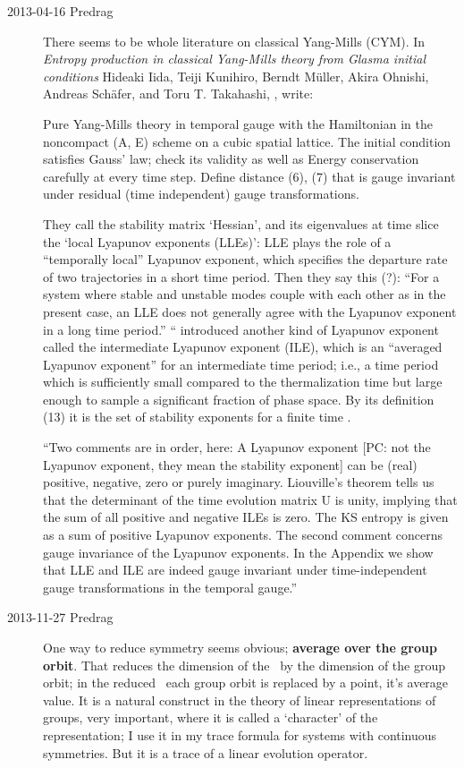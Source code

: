 \begin{description}
\item[2013-04-16  Predrag] There seems to be whole literature on
classical Yang-Mills (CYM). In
{\em Entropy production in classical Yang-Mills theory from Glasma
initial conditions} Hideaki Iida,  Teiji Kunihiro,  Berndt M\"uller,
Akira Ohnishi,  Andreas Sch\"afer,  and Toru T. Takahashi,
, %
write:

Pure Yang-Mills theory in temporal gauge with the Hamiltonian in the
noncompact (A, E) scheme on a cubic spatial lattice. The initial
condition satisfies Gauss' law; check its validity as well as Energy
conservation carefully at every time step. Define distance (6), (7) that
is gauge invariant under residual (time independent) gauge transformations.

                                                    \inCB
They call the stability matrix `Hessian', and its eigenvalues at time
slice the `local Lyapunov exponents (LLEs)': LLE plays the
role of a ``temporally local'' Lyapunov exponent, which specifies the
departure rate of two trajectories in a short time period. Then they say
this (?): ``For a system where stable and unstable modes couple with each
other as in the present case, an LLE does not generally agree with the
Lyapunov exponent in a long time period.'' `` introduced
another kind of Lyapunov exponent called the intermediate Lyapunov
exponent (ILE), which is an ``averaged Lyapunov exponent'' for an
intermediate time period; i.e., a time period which is sufficiently small
compared to the thermalization time but large enough to sample a
significant fraction of phase space. By its definition (13) it
is the set of stability exponents for a finite time \jacobianM.

``Two comments are in order, here: A Lyapunov exponent [PC: not the
Lyapunov exponent, they mean the stability exponent] can be (real)
positive, negative, zero or purely imaginary. Liouville's theorem tells
us that the determinant of the time evolution matrix U is unity, implying
that the sum of all positive and negative ILEs is zero. The KS entropy is
given as a sum of positive Lyapunov exponents. The second comment
concerns gauge invariance of the Lyapunov exponents. In the Appendix we
show that LLE and ILE are indeed gauge invariant under time-independent
gauge transformations in the temporal gauge.''

\item[2013-11-27  Predrag] One way to reduce symmetry seems obvious;
\textbf{average over the group orbit}. That reduces the dimension of the \statesp\
by the dimension of the group orbit; in the reduced \statesp\ each group
orbit is replaced by a point, it's average value. It is a natural construct
in the theory of linear
representations of groups, very important, where it is called a
`character' of the representation; I use it in my
 {trace formula} for
systems with continuous symmetries. But it is a trace of a linear evolution
operator.


\end{description}
